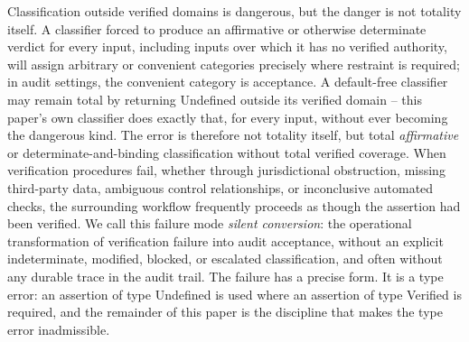 \documentclass[11pt,a4paper]{article}
\theoremstyle{definition}
\theoremstyle{remark}
\begin{document}
Classification outside verified domains is dangerous, but the danger is not totality itself. A classifier forced to produce an affirmative or otherwise determinate verdict for every input, including inputs over which it has no verified authority, will assign arbitrary or convenient categories precisely where restraint is required; in audit settings, the convenient category is acceptance. A default-free classifier may remain total by returning \textsf{Undefined} outside its verified domain -- this paper's own classifier does exactly that, for every input, without ever becoming the dangerous kind. The error is therefore not totality itself, but total \emph{affirmative} or determinate-and-binding classification without total verified coverage. When verification procedures fail, whether through jurisdictional obstruction, missing third-party data, ambiguous control relationships, or inconclusive automated checks, the surrounding workflow frequently proceeds as though the assertion had been verified. We call this failure mode \emph{silent conversion}: the operational transformation of verification failure into audit acceptance, without an explicit indeterminate, modified, blocked, or escalated classification, and often without any durable trace in the audit trail. The failure has a precise form. It is a type error: an assertion of type \textsf{Undefined} is used where an assertion of type \textsf{Verified} is required, and the remainder of this paper is the discipline that makes the type error inadmissible.
\end{document}
